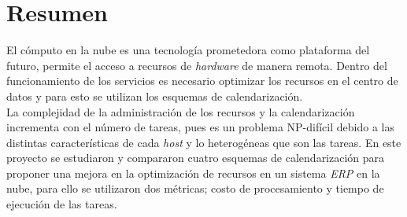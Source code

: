 \chapter*{Resumen}



El c\'omputo en la nube es una tecnolog\'ia prometedora como plataforma del futuro, permite el acceso a recursos de  \textit{hardware} de manera remota. Dentro del funcionamiento de los servicios es necesario optimizar los recursos en el centro de datos y para esto se utilizan los esquemas de calendarizaci\'on.\\ La complejidad de la administraci\'on de los recursos y la calendarizaci\'on incrementa con el n\'umero de tareas, pues es un problema NP-dif\'icil debido a las distintas caracter\'isticas de cada \textit{host} y lo heterog\'eneas que son las tareas.
En este proyecto se estudiaron y compararon cuatro esquemas de calendarizaci\'on para proponer una mejora en la optimizaci\'on de recursos en un sistema \textit{ERP} en la nube, para ello se utilizaron dos m\'etricas; costo de procesamiento y tiempo de ejecuci\'on de las tareas.



